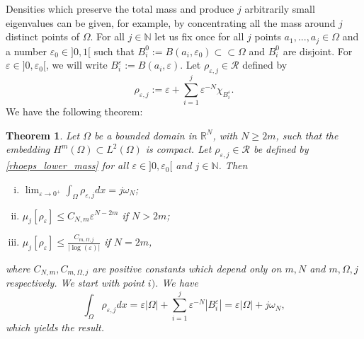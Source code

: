 \documentclass[11pt,a4paper]{amsart}
\numberwithin{equation}{section}
\newtheorem{thm}[equation]{Theorem}
\begin{document}
Densities which preserve the total mass and produce $j$ arbitrarily small eigenvalues can be given, for example, by concentrating all the mass around $j$ distinct points of $\Omega$. For all $j\in\mathbb N$ let us fix once for all $j$ points $a_1,...,a_j\in\Omega$ and a number $\varepsilon_0\in]0,1[$ such that $B_i^0:=B(a_i,\varepsilon_0)\subset\subset\Omega$ and $B_i^0$ are disjoint. For $\varepsilon\in]0,\varepsilon_0[$, we will write $B_i^{\varepsilon}:=B(a_i,\varepsilon)$. Let $\rho_{\varepsilon,j}\in\mathcal R$ defined by
\begin{equation}\label{rhoeps_lower_mass}
\rho_{\varepsilon,j}:=\varepsilon+\sum_{i=1}^j\varepsilon^{-N}\chi_{B_i^{\varepsilon}}.
\end{equation}
We have the following theorem:
\begin{thm}\label{lowerbound_counter_mass}
Let $\Omega$ be a bounded domain in $\mathbb R^N$, with $N\geq 2m$, such that the embedding $H^m(\Omega)\subset L^2(\Omega)$ is compact. Let $\rho_{\varepsilon,j}\in\mathcal R$ be defined by \eqref{rhoeps_lower_mass} for all $\varepsilon\in]0,\varepsilon_0[$ and $j\in\mathbb N$. Then
\begin{enumerate}[i)]
\item $\lim_{\varepsilon\rightarrow 0^+}\int_{\Omega}\rho_{\varepsilon,j}dx=j\omega_N$;
\item $\mu_j[\rho_{\varepsilon}]\leq C_{N,m}\varepsilon^{N-2m}$ if $N>2m$;
\item $\mu_j[\rho_{\varepsilon}]\leq \frac{C_{m,\Omega,j}}{|\log(\varepsilon)|}$ if $N=2m$,
\end{enumerate}
where $C_{N,m},C_{m,\Omega,j}$ are positive constants which depend only on $m,N$ and $m,\Omega,j$ respectively.
\proof
We start with point $i)$. We have
$$
\int_{\Omega}\rho_{\varepsilon,j}dx=\varepsilon|\Omega|+\sum_{i=1}^j\varepsilon^{-N}|B_i^{\varepsilon}|=\varepsilon|\Omega|+j\omega_N,
$$
which yields the result. 


\end{thm}
\end{document}
